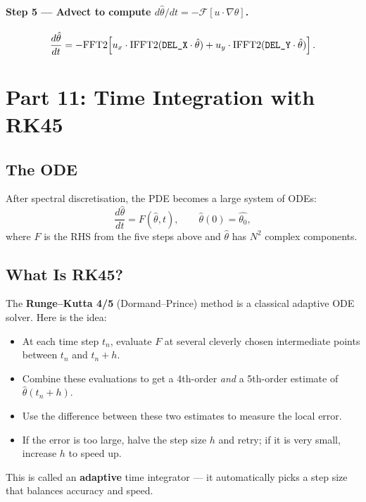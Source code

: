 \documentclass[12pt,a4paper]{article}
\newcommand{\DELX}{\text{\texttt{DEL\_X}}}
\newcommand{\DELY}{\text{\texttt{DEL\_Y}}}
\theoremstyle{definition}
\begin{document}
\paragraph{Step 5 — Advect to compute $d\hat\theta/dt = -\mathcal{F}[u\cdot\nabla\theta]$.}
\[
  \frac{d\hat\theta}{dt}
  = -\mathrm{FFT2}\!\left[u_x\cdot\mathrm{IFFT2}(\DELX\cdot\hat\theta)
    + u_y\cdot\mathrm{IFFT2}(\DELY\cdot\hat\theta)\right].
\]

\section{Part 11: Time Integration with RK45}

\subsection{The ODE}

After spectral discretisation, the PDE becomes a large system of ODEs:
\begin{equation}
  \frac{d\hat\theta}{dt} = F(\hat\theta,t),
  \qquad \hat\theta(0) = \widehat{\theta_0},
\end{equation}
where $F$ is the RHS from the five steps above and $\hat\theta$ has $N^2$
complex components.

\subsection{What Is RK45?}

The \textbf{Runge--Kutta 4/5} (Dormand--Prince) method is a classical
adaptive ODE solver.  Here is the idea:
\begin{itemize}
  \item At each time step $t_n$, evaluate $F$ at several cleverly chosen
    intermediate points between $t_n$ and $t_n + h$.
  \item Combine these evaluations to get a 4th-order \emph{and} a 5th-order
    estimate of $\hat\theta(t_n+h)$.
  \item Use the difference between these two estimates to measure the local
    error.
  \item If the error is too large, halve the step size $h$ and retry; if it
    is very small, increase $h$ to speed up.
\end{itemize}
This is called an \textbf{adaptive} time integrator — it automatically picks a
step size that balances accuracy and speed.
\end{document}

